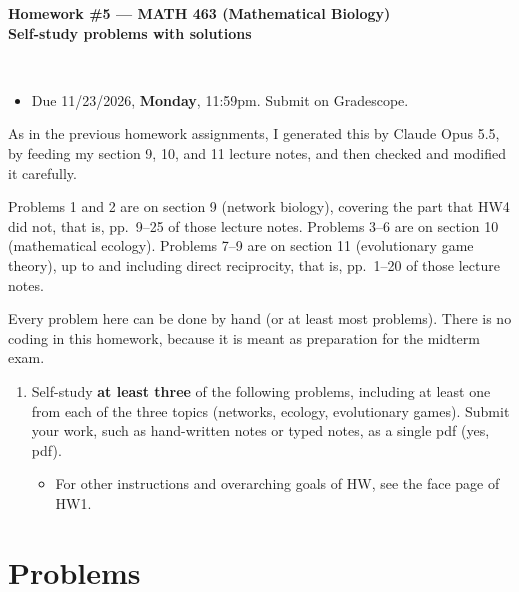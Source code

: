\documentclass[a4paper,12pt]{article}
\begin{document}

\begin{center}
\begin{large}
\textbf{Homework \#5 ---  MATH 463 (Mathematical Biology)\\
Self-study problems with solutions}
\end{large}\\
\end{center}

\begin{screen}
\begin{itemize}
\item Due 11/23/2026, \textbf{Monday}, 11:59pm. Submit on Gradescope.
\end{itemize}
\end{screen}

As in the previous homework assignments, I generated this by Claude Opus 5.5, by feeding my section 9, 10, and 11 lecture notes, and then checked and modified it carefully.

Problems 1 and 2 are on section 9 (network biology), covering the part that HW4 did not, that is, pp.~9--25 of those lecture notes. Problems 3--6 are on section 10 (mathematical ecology). Problems 7--9 are on section 11 (evolutionary game theory), up to and including direct reciprocity, that is, pp.~1--20 of those lecture notes.

Every problem here can be done by hand (or at least most problems). There is no coding in this homework, because it is meant as preparation for the midterm exam.

\begin{enumerate}

\item Self-study \textbf{at least three} of the following problems, including at least one from each of the three topics (networks, ecology, evolutionary games). Submit your work, such as hand-written notes or typed notes, as a single pdf (yes, pdf).
\begin{itemize}
\item For other instructions and overarching goals of HW, see the face page of HW1.
\end{itemize}

\end{enumerate}

\newpage

\section*{Problems}
\end{document}
